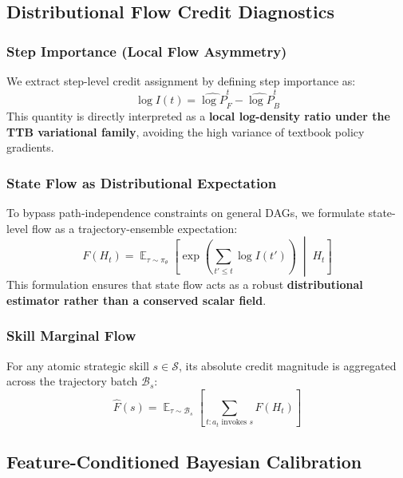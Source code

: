 \documentclass[12pt]{article}
\DeclareMathOperator*{\E}{\mathbb{E}}
\begin{document}
\subsection{Distributional Flow Credit Diagnostics}

\subsubsection{Step Importance (Local Flow Asymmetry)}
We extract step-level credit assignment by defining step importance as:
\begin{equation}
\log I(t) = \hat{\log P}_F^t - \hat{\log P}_B^t
\end{equation}
This quantity is directly interpreted as a \textbf{local log-density ratio under the TTB variational family}, avoiding the high variance of textbook policy gradients.

\subsubsection{State Flow as Distributional Expectation}
To bypass path-independence constraints on general DAGs, we formulate state-level flow as a trajectory-ensemble expectation:
\begin{equation}
F(H_t) = \E_{\tau \sim \pi_\theta} \left[ \exp\left(\sum_{t' \le t} \log I(t')\right) \;\middle|\; H_t \right]
\end{equation}
This formulation ensures that state flow acts as a robust \textbf{distributional estimator rather than a conserved scalar field}.

\subsubsection{Skill Marginal Flow}
For any atomic strategic skill $s \in \mathcal{S}$, its absolute credit magnitude is aggregated across the trajectory batch $\mathcal{B}_s$:
\begin{equation}
\hat{F}(s) = \E_{\tau \sim \mathcal{B}_s} \left[ \sum_{t: a_t \text{ invokes } s} F(H_t) \right]
\end{equation}

\subsection{Feature-Conditioned Bayesian Calibration}
\end{document}

